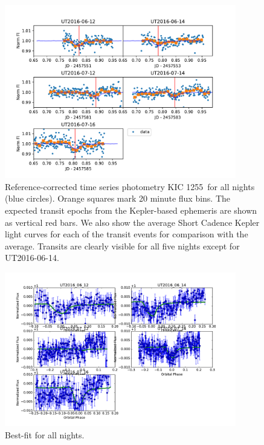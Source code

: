 \documentclass[preprint]{aastex61}
\newcommand{\shStar}{KIC 1255}
\begin{document}
\begin{figure}
\begin{centering}
\includegraphics[width=0.9\textwidth]{images/all_kic1255_phot/all_kic1255_refcor.pdf}
\caption{Reference-corrected time series photometry \shStar\ for all nights (blue circles).
Orange squares mark 20 minute flux bins.
The expected transit epochs from the Kepler-based ephemeris \citep{vanWerkhoven2014} are shown as vertical red bars.
We also show the average Short Cadence Kepler light curves for each of the transit events for comparison with the average.
Transits are clearly visible for all five nights except for UT2016-06-14.}\label{fig:allNightrefCorrect}
\end{centering}
\end{figure}

\begin{figure}
\begin{centering}
\includegraphics[width=0.9\textwidth]{images/tser_fits/best_fit_all.pdf}
\caption{Best-fit for all nights.}\label{fig:fitAll}
\end{centering}
\end{figure}
\end{document}
